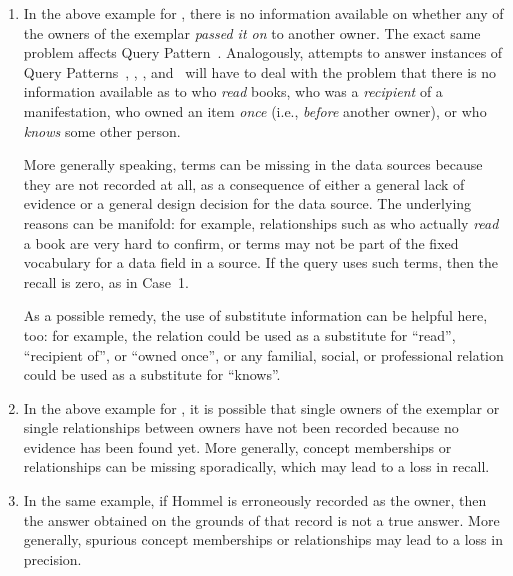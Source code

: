 \begin{enumerate}
  \item
    In the above example for , there is no information available on whether any of the owners of the exemplar
    \emph{passed it on} to another owner. The exact same problem affects Query Pattern~.
    Analogously,
    attempts to answer instances of Query Patterns~, , , and~
    will have to deal
    with the problem that there is no information available as to who \emph{read} books,
    who was a \emph{recipient} of a manifestation, who owned an item \emph{once} (i.e., \emph{before} another owner),
    or who \emph{knows} some other person.
    
    More generally speaking, terms can be missing in the data sources
    because they are not recorded at all, as a consequence of either a general lack of evidence
    or a general design decision for the data source. The underlying reasons can be manifold:
    for example, relationships such as who actually \emph{read} a book are very hard to confirm,
    or terms may not be part of the fixed vocabulary for a data field in a source.
    If the query uses such terms, then the recall is zero, as in Case~1.
    
    As a possible remedy, the use of substitute information can be helpful here, too:
    for example, the relation  could be used as a substitute for
    \enquote{read}, \enquote{recipient of}, or \enquote{owned once},
    or any familial, social, or professional relation could be used as a substitute for \enquote{knows}.
  \item    
    In the above example for , it is possible that single owners of the exemplar or single relationships between owners
    have not been recorded because no evidence has been found yet.
    More generally, concept memberships or relationships can be missing sporadically,
    which may lead to a loss in recall.
  \item
    In the same example, if \foreignlanguage{ngerman}{Hommel} is erroneously recorded as the owner, then the answer obtained on the grounds
    of that record is not a true answer.
    More generally, spurious concept memberships or relationships may lead to a loss in precision.
\end{enumerate}
